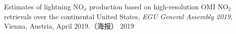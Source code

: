 \begin{cvpublications}
\publication
{ Estimates of lightning NO$_x$ production based on high-resolution OMI NO$_2$ retrievals over the continental United States,
\emph{EGU General Assembly 2019},
Vienna, Austria, April 2019.（海报）} %
{2019} %

\end{cvpublications}
